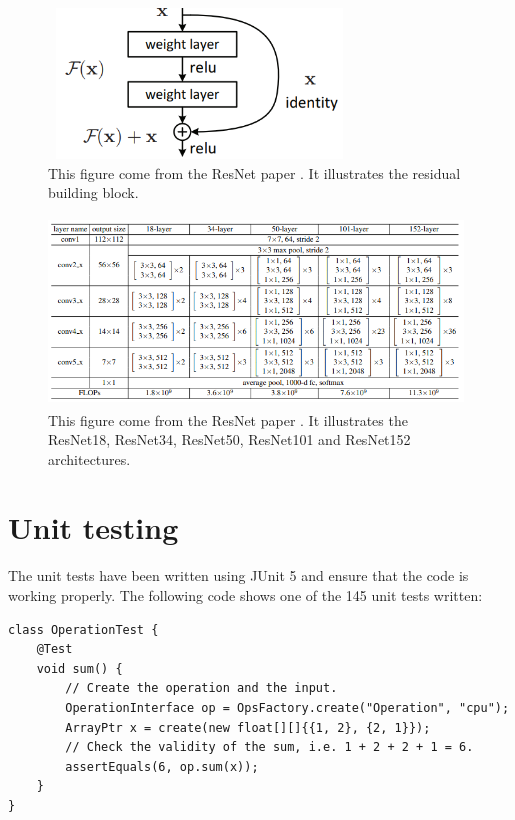 \documentclass[11pt]{report}
\begin{document}
\begin{figure}[h]
\centering
\includegraphics[width=8cm, height=4cm]{resblock}
\caption[Residual block]{This figure come from the ResNet paper \cite{DBLP:conf/cvpr/HeZRS16}. It illustrates the residual building block.}
\label{fig:resblock}
\end{figure}

\begin{figure}[h]
\centering
\includegraphics[width=11cm, height=5cm]{resnet}
\caption[ResNet architectures]{This figure come from the ResNet paper \cite{DBLP:conf/cvpr/HeZRS16}. It illustrates the ResNet18, ResNet34, ResNet50, ResNet101 and ResNet152 architectures.}
\label{fig:resnet}
\end{figure}

\newpage
\section{Unit testing}

The unit tests have been written using JUnit 5 and ensure that the code is working properly. The following code shows one of the 145 unit tests written:

\begin{verbatim}
class OperationTest {
    @Test
    void sum() {
        // Create the operation and the input.
        OperationInterface op = OpsFactory.create("Operation", "cpu");
        ArrayPtr x = create(new float[][]{{1, 2}, {2, 1}});
        // Check the validity of the sum, i.e. 1 + 2 + 2 + 1 = 6.
        assertEquals(6, op.sum(x));
    }
}
\end{verbatim}
\end{document}
